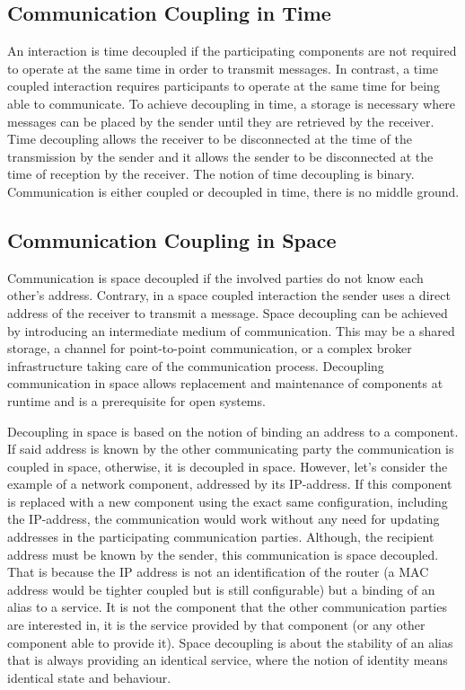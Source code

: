 \subsection{Communication Coupling in Time}
\label{sect_background_decoupling_time}
An interaction is time decoupled if the participating components are not required to operate at the same time in order to transmit messages.
In contrast, a time coupled interaction requires participants to operate at the same time for being able to communicate.
To achieve decoupling in time, a storage is necessary where messages can be placed by the sender until they are retrieved by the receiver.
Time decoupling allows the receiver to be disconnected at the time of the transmission by the sender and it allows the sender to be disconnected at the time of reception by the receiver.
The notion of time decoupling is binary.
Communication is either coupled or decoupled in time, there is no middle ground.

\subsection{Communication Coupling in Space}
\label{sect_background_decoupling_space}
Communication is space decoupled if the involved parties do not know each other's address.
Contrary, in a space coupled interaction the sender uses a direct address of the receiver to transmit a message.
Space decoupling can be achieved by introducing an intermediate medium of communication.
This may be a shared storage, a channel for point-to-point communication, or a complex broker infrastructure taking care of the communication process.
Decoupling communication in space allows replacement and maintenance of components at runtime and is a prerequisite for open systems.

Decoupling in space is based on the notion of binding an address to a component.
If said address is known by the other communicating party the communication is coupled in space, otherwise, it is decoupled in space.
However, let's consider the example of a network component, addressed by its IP-address.
If this component is replaced with a new component using the exact same configuration, including the IP-address, the communication would work without any need for updating addresses in the participating communication parties.
Although, the recipient address must be known by the sender, this communication is space decoupled.
That is because the IP address is not an identification of the router (a MAC address would be tighter coupled but is still configurable) but a binding of an alias to a service.
It is not the component that the other communication parties are interested in, it is the service provided by that component (or any other component able to provide it).
Space decoupling is about the stability of an alias that is always providing an identical service, where the notion of identity means identical state and behaviour.

